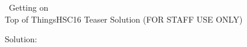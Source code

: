 
\begin{customPuzzle}{~}{Getting on\\Top of Things}{HSC16 Teaser Solution}
  (FOR STAFF USE ONLY)

  \begin{center}
    {\large Solution:}
  \end{center}
  \begin{center}
    \hspace{2em}
  \end{center}
  \begin{center}
  \end{center}


\end{customPuzzle}
